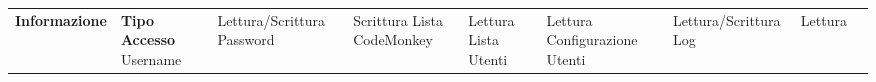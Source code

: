 \begin{center}
    \phantom{M}%


    \begin{tabularx}
        {\textwidth} {|X|X|}
        \hline  {}
        \n      {}
        \large \textbf{Informazione}  & \centering\large\textbf{Tipo Accesso}
        \n      Username              & Lettura/Scrittura
        \n      Password              & Scrittura
        \n      Lista CodeMonkey      & Lettura
        \n      Lista Utenti          & Lettura
        \n      Configurazione Utenti & Lettura/Scrittura
        \n      Log                   & Lettura
        \n
    \end{tabularx}\label{tab:monkeytable:problema:tabellaRuoloInformazioni:Amministratore}
\end{center}
